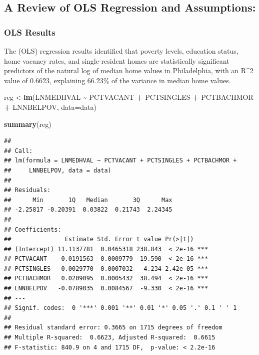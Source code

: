 \documentclass[
]{article}
\newenvironment{Shaded}{\begin{snugshade}}{\end{snugshade}}
\newcommand{\AttributeTok}[1]{\textcolor[rgb]{0.13,0.29,0.53}{#1}}
\newcommand{\FunctionTok}[1]{\textcolor[rgb]{0.13,0.29,0.53}{\textbf{#1}}}
\newcommand{\NormalTok}[1]{#1}
\newcommand{\OtherTok}[1]{\textcolor[rgb]{0.56,0.35,0.01}{#1}}
\newcommand{\SpecialCharTok}[1]{\textcolor[rgb]{0.81,0.36,0.00}{\textbf{#1}}}
\begin{document}
\hypertarget{a-review-of-ols-regression-and-assumptions-1}{%
\subsection{A Review of OLS Regression and
Assumptions:}\label{a-review-of-ols-regression-and-assumptions-1}}

\hypertarget{ols-results}{%
\subsubsection{OLS Results}\label{ols-results}}

The (OLS) regression results identified that poverty levels, education
status, home vacancy rates, and single-resident homes are statistically
significant predictors of the natural log of median home values in
Philadelphia, with an R\^{}2 value of 0.6623, explaining 66.23\% of the
variance in median home values.

\begin{Shaded}
\begin{Highlighting}[]
\NormalTok{reg }\OtherTok{\textless{}{-}}\FunctionTok{lm}\NormalTok{(LNMEDHVAL }\SpecialCharTok{\textasciitilde{}}\NormalTok{  PCTVACANT }\SpecialCharTok{+}\NormalTok{ PCTSINGLES }\SpecialCharTok{+}\NormalTok{ PCTBACHMOR }\SpecialCharTok{+}\NormalTok{ LNNBELPOV, }\AttributeTok{data=}\NormalTok{data)}

\FunctionTok{summary}\NormalTok{(reg)}
\end{Highlighting}
\end{Shaded}

\begin{verbatim}
## 
## Call:
## lm(formula = LNMEDHVAL ~ PCTVACANT + PCTSINGLES + PCTBACHMOR + 
##     LNNBELPOV, data = data)
## 
## Residuals:
##      Min       1Q   Median       3Q      Max 
## -2.25817 -0.20391  0.03822  0.21743  2.24345 
## 
## Coefficients:
##               Estimate Std. Error t value Pr(>|t|)    
## (Intercept) 11.1137781  0.0465318 238.843  < 2e-16 ***
## PCTVACANT   -0.0191563  0.0009779 -19.590  < 2e-16 ***
## PCTSINGLES   0.0029770  0.0007032   4.234 2.42e-05 ***
## PCTBACHMOR   0.0209095  0.0005432  38.494  < 2e-16 ***
## LNNBELPOV   -0.0789035  0.0084567  -9.330  < 2e-16 ***
## ---
## Signif. codes:  0 '***' 0.001 '**' 0.01 '*' 0.05 '.' 0.1 ' ' 1
## 
## Residual standard error: 0.3665 on 1715 degrees of freedom
## Multiple R-squared:  0.6623, Adjusted R-squared:  0.6615 
## F-statistic: 840.9 on 4 and 1715 DF,  p-value: < 2.2e-16
\end{verbatim}
\end{document}
